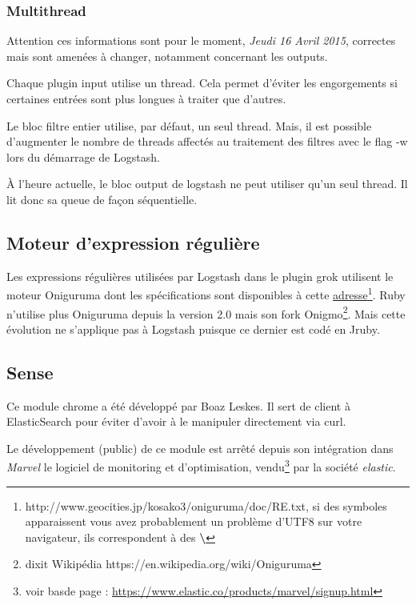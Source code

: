 \subsubsection{Multithread}
\label{subsec:logstashmultithread}
{\footnotesize Attention ces informations sont pour le moment, \textit{Jeudi 16 Avril 2015}, correctes 
mais sont amenées à changer, notamment concernant les outputs.}

Chaque plugin input utilise un \gls{thread}. Cela permet d'éviter les engorgements si  
certaines entrées sont plus longues à traiter que d'autres.

Le bloc filtre entier utilise, par défaut, un seul thread. Mais, il est possible 
d'augmenter le nombre de threads affectés au traitement des filtres avec le \gls{flag}
-w lors du démarrage de Logstash.

À l'heure actuelle, le bloc output de logstash ne peut utiliser qu'un seul thread.
Il lit donc sa queue de façon séquentielle. 

\subsection{Moteur d'expression régulière}
\label{subsec:logstashregexengine}
Les expressions régulières utilisées par Logstash dans le plugin grok utilisent le 
moteur Oniguruma dont les spécifications sont disponibles à cette 
\href{http://www.geocities.jp/kosako3/oniguruma/doc/RE.txt}{adresse}\footnote{http://www.geocities.jp/kosako3/oniguruma/doc/RE.txt, 
si des symboles \textbf{ \textyen} apparaissent vous avez probablement un problème d'UTF8 sur 
votre navigateur, ils correspondent à des \textbf{ \textbackslash}}.
Ruby n'utilise plus Oniguruma depuis la version 2.0 mais son fork Onigmo\footnote{
dixit Wikipédia https://en.wikipedia.org/wiki/Oniguruma}. Mais cette évolution ne
s'applique pas à Logstash puisque ce dernier est codé en Jruby.

\subsection{Sense}
\label{subsec:elasticsense}
Ce module chrome a été développé par Boaz Leskes. Il sert de client à ElasticSearch
pour éviter d'avoir à le manipuler directement via curl.

Le développement (public) de ce module est arrêté depuis son intégration dans \emph{Marvel} 
le logiciel de monitoring et d'optimisation, vendu\footnote{voir basde page : 
\url{https://www.elastic.co/products/marvel/signup.html}} par la société \emph{elastic}.


